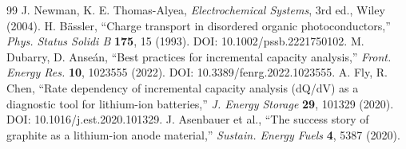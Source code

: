 \documentclass[11pt,a4paper]{article}
\begin{document}
\begin{thebibliography}{99}
 J. Newman, K. E. Thomas-Alyea, \emph{Electrochemical Systems}, 3rd
  ed., Wiley (2004).
 H. Bässler, ``Charge transport in disordered organic
  photoconductors,'' \emph{Phys. Status Solidi B} \textbf{175}, 15 (1993). DOI:
  10.1002/pssb.2221750102.
 M. Dubarry, D. Anseán, ``Best practices for incremental capacity
  analysis,'' \emph{Front. Energy Res.} \textbf{10}, 1023555 (2022). DOI:
  10.3389/fenrg.2022.1023555.
 A. Fly, R. Chen, ``Rate dependency of incremental capacity analysis
  (dQ/dV) as a diagnostic tool for lithium-ion batteries,'' \emph{J. Energy Storage}
  \textbf{29}, 101329 (2020). DOI: 10.1016/j.est.2020.101329.
 J. Asenbauer et al., ``The success story of graphite as a
  lithium-ion anode material,'' \emph{Sustain. Energy Fuels} \textbf{4}, 5387 (2020).
\end{thebibliography}
\end{document}
